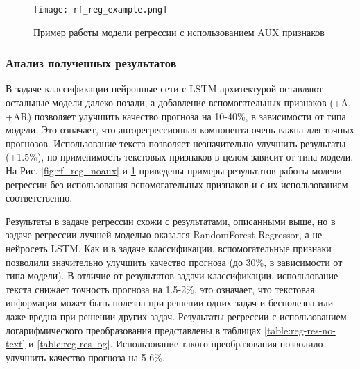 \begin{figure}
  \texttt{[image: rf\_reg\_example.png]}
  \caption{Пример работы модели регрессии с использованием AUX признаков}
  \label{fig:rf_reg_example}
\end{figure}


\subsubsection{Анализ полученных результатов}
В задаче классификации нейронные сети с LSTM-архитектурой оставляют остальные модели далеко позади, а добавление вспомогательных признаков 
(+A, +AR) позволяет улучшить качество прогноза на 10-40\%, в зависимости от типа модели. Это означает, что авторегрессионная компонента очень важна для точных прогнозов. Использование текста позволяет незначительно улучшить результаты (+1.5\%), но применимость текстовых признаков в целом зависит от типа модели. На Рис. \ref{fig:rf_reg_noaux} и \ref{fig:rf_reg_example} приведены примеры результатов работы модели регрессии без использования вспомогательных признаков и с их использованием соответственно.

Результаты в задаче регрессии схожи с результатами, описанными выше, но в задаче регрессии лучшей моделью оказался RandomForest Regressor, а не нейросеть LSTM. Как и в задаче классификации, вспомогательные признаки позволили значительно улучшить качество прогноза (до 30\%, в зависимости от типа модели).
В отличие от результатов задачи классификации, использование текста снижает точность прогноза на 1.5-2\%, это означает, что текстовая информация может быть полезна при решении одних задач и бесполезна или даже вредна при решении других задач.
Результаты регрессии с использованием логарифмического преобразования представлены в таблицах \ref{table:reg-res-no-text} и \ref{table:reg-res-log}. Использование такого преобразования позволило улучшить качество прогноза на 5-6\%.
